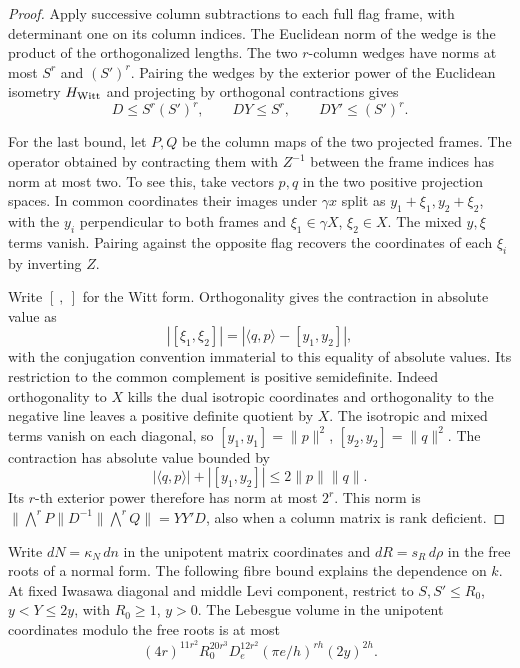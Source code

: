 \begin{proof}

Apply successive column subtractions to each full flag frame,
with determinant one on its column indices. The Euclidean norm
of the wedge is the product of the orthogonalized lengths.
The two \(r\)-column wedges have norms at most \(S^r\) and
\((S')^r\). Pairing the wedges by the exterior power of the Euclidean
isometry \(H_{\rm Witt}\) and projecting by orthogonal contractions
gives
\[
     D\le S^r(S')^r,\qquad DY\le S^r,\qquad DY'\le(S')^r .
\]

For the last bound, let \(P,Q\) be the column maps of the two
projected frames. The operator obtained by contracting them
with \(Z^{-1}\) between the frame indices has norm at most
two. To see this, take vectors \(p,q\) in the two positive
projection spaces. In common coordinates their images under
\(\gamma x\) split as \(y_1+\xi_1,y_2+\xi_2\), with the
\(y_i\) perpendicular to both frames and \(\xi_1\in\gamma X\),
\(\xi_2\in X\). The mixed \(y,\xi\) terms vanish. Pairing
against the opposite flag recovers the coordinates of each
\(\xi_i\) by inverting \(Z\).

Write \([\ ,\ ]\) for the Witt form. Orthogonality gives the
contraction in absolute value as
\[
     |[\xi_1,\xi_2]|=|\langle q,p\rangle-[y_1,y_2]| ,
\]
with the conjugation convention immaterial to this equality of
absolute values. Its
restriction to the common complement is positive semidefinite.
Indeed orthogonality to \(X\) kills the dual isotropic coordinates
and orthogonality to the negative line leaves a positive
definite quotient by \(X\). The isotropic and mixed terms vanish on each diagonal,
so \([y_1,y_1]=\|p\|^2\), \([y_2,y_2]=\|q\|^2\).
The contraction has absolute value bounded by
\[
  |\langle q,p\rangle|+|[y_1,y_2]|\le 2\|p\|\|q\|.
\]
Its \(r\)-th exterior power therefore has norm at most
\(2^r\). This norm is \(\|\bigwedge^r P\|D^{-1}\|\bigwedge^r Q\|=YY'D\),
also when a column matrix is rank deficient.

\end{proof}

Write \(dN=\kappa_N\,dn\) in the unipotent matrix coordinates
and \(dR=s_R\,d\rho\) in the free roots of a normal form. The
following fibre bound explains the dependence on \(k\). At fixed
Iwasawa diagonal and middle Levi component, restrict to
\(S,S'\le R_0\), \(y<Y\le2y\), with \(R_0\ge1\), \(y>0\).
The Lebesgue volume in the unipotent coordinates modulo the
free roots is at most
\begin{equation}\label{eq:fibre-volume}
 (4r)^{11r^2}R_0^{20r^3}D_e^{12r^2}
       (\pi e/h)^{rh}(2y)^{2h}.
\end{equation}

